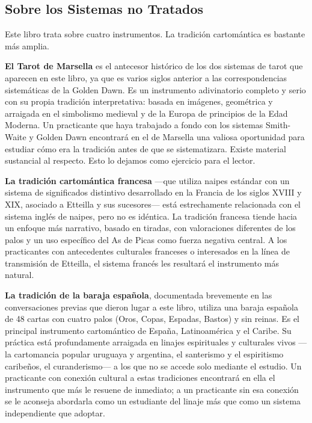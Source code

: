 \subsection{Sobre los Sistemas no Tratados}\label{on-systems-not-covered}

Este libro trata sobre cuatro instrumentos. La tradición cartomántica es bastante más amplia.

\textbf{El Tarot de Marsella} es el antecesor histórico de los dos sistemas de tarot que aparecen en este libro, ya que es varios siglos anterior a las correspondencias sistemáticas de la Golden Dawn. Es un instrumento adivinatorio completo y serio con su propia tradición interpretativa: basada en imágenes, geométrica y arraigada en el simbolismo medieval y de la Europa de principios de la Edad Moderna. Un practicante que haya trabajado a fondo con los sistemas Smith-Waite y Golden Dawn encontrará en el de Marsella una valiosa oportunidad para estudiar cómo era la tradición antes de que se sistematizara. Existe material sustancial al respecto. Esto lo dejamos como ejercicio para el lector.

\textbf{La tradición cartomántica francesa} ---que utiliza naipes estándar con un sistema de significados distintivo desarrollado en la Francia de los siglos XVIII y XIX, asociado a Etteilla y sus sucesores--- está estrechamente relacionada con el sistema inglés de naipes, pero no es idéntica. La tradición francesa tiende hacia un enfoque más narrativo, basado en tiradas, con valoraciones diferentes de los palos y un uso específico del As de Picas como fuerza negativa central. A los practicantes con antecedentes culturales franceses o interesados en la línea de transmisión de Etteilla, el sistema francés les resultará el instrumento más natural.

\textbf{La tradición de la baraja española}, documentada brevemente en las conversaciones previas que dieron lugar a este libro, utiliza una baraja española de 48 cartas con cuatro palos (Oros, Copas, Espadas, Bastos) y sin reinas. Es el principal instrumento cartomántico de España, Latinoamérica y el Caribe. Su práctica está profundamente arraigada en linajes espirituales y culturales vivos ---la cartomancia popular uruguaya y argentina, el santerismo y el espiritismo caribeños, el curanderismo--- a los que no se accede solo mediante el estudio. Un practicante con conexión cultural a estas tradiciones encontrará en ella el instrumento que más le resuene de inmediato; a un practicante sin esa conexión se le aconseja abordarla como un estudiante del linaje más que como un sistema independiente que adoptar.

